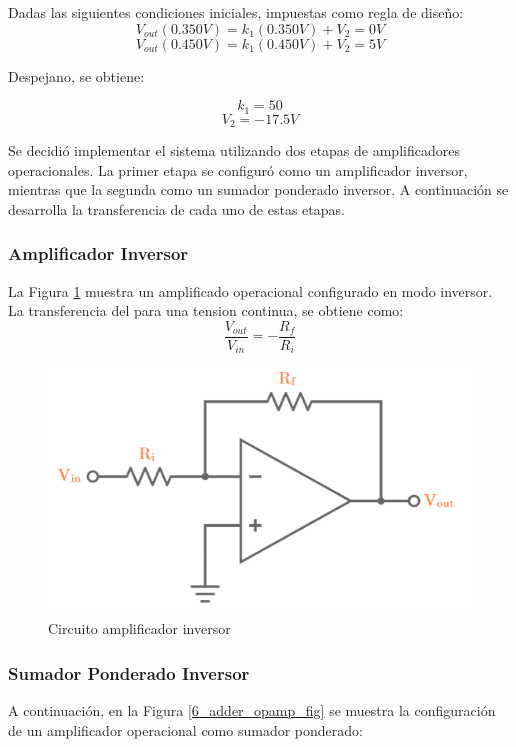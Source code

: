 Dadas las siguientes condiciones iniciales, impuestas como regla de diseño:
\[V_{out}(0.350V) = k_1(0.350V) + V_2 = 0V\]
\[V_{out}(0.450V) = k_1(0.450V) + V_2 = 5V\]

Despejano, se obtiene:

\[k_1 = 50\]
\[V_2 = -17.5V\]

Se decidió implementar el sistema utilizando dos etapas de amplificadores operacionales. La primer etapa se configuró como un amplificador inversor, mientras que la segunda como un sumador ponderado inversor. A continuación se desarrolla la transferencia de cada uno de estas etapas.

\subsubsection{Amplificador Inversor}
La Figura \ref{6_invert_opamp_fig} muestra un amplificado operacional configurado en modo inversor. La transferencia del para una tension continua, se obtiene como:
\[\frac{V_{out}}{V_{in}} = - \frac{R_f}{R_i}\]

\begin{figure}[ht]
\centering
\includegraphics[scale=0.3]{../parte6/Informe_Latex/reources/inverting_opamp_diagram.png}
\caption{Circuito amplificador inversor}
\label{6_invert_opamp_fig}
\end{figure}

\subsubsection{Sumador Ponderado Inversor}
A continuación, en la Figura \ref{6_adder_opamp_fig} se muestra la configuración de un amplificador operacional como sumador ponderado:

